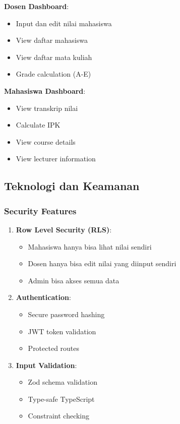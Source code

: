 \documentclass[12pt,a4paper]{article}
\begin{document}
\textbf{Dosen Dashboard}:
\begin{itemize}
    \item Input dan edit nilai mahasiswa
    \item View daftar mahasiswa
    \item View daftar mata kuliah
    \item Grade calculation (A-E)
\end{itemize}

\textbf{Mahasiswa Dashboard}:
\begin{itemize}
    \item View transkrip nilai
    \item Calculate IPK
    \item View course details
    \item View lecturer information
\end{itemize}

\subsection{Teknologi dan Keamanan}

\subsubsection{Security Features}

\begin{enumerate}
    \item \textbf{Row Level Security (RLS)}:
    \begin{itemize}
        \item Mahasiswa hanya bisa lihat nilai sendiri
        \item Dosen hanya bisa edit nilai yang diinput sendiri
        \item Admin bisa akses semua data
    \end{itemize}
    
    \item \textbf{Authentication}:
    \begin{itemize}
        \item Secure password hashing
        \item JWT token validation
        \item Protected routes
    \end{itemize}
    
    \item \textbf{Input Validation}:
    \begin{itemize}
        \item Zod schema validation
        \item Type-safe TypeScript
        \item Constraint checking
    \end{itemize}
\end{enumerate}
\end{document}

